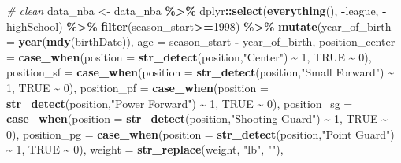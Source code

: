 \documentclass[
]{book}
\newenvironment{Shaded}{\begin{snugshade}}{\end{snugshade}}
\newcommand{\AttributeTok}[1]{\textcolor[rgb]{0.13,0.29,0.53}{#1}}
\newcommand{\CommentTok}[1]{\textcolor[rgb]{0.56,0.35,0.01}{\textit{#1}}}
\newcommand{\ConstantTok}[1]{\textcolor[rgb]{0.56,0.35,0.01}{#1}}
\newcommand{\DecValTok}[1]{\textcolor[rgb]{0.00,0.00,0.81}{#1}}
\newcommand{\FunctionTok}[1]{\textcolor[rgb]{0.13,0.29,0.53}{\textbf{#1}}}
\newcommand{\NormalTok}[1]{#1}
\newcommand{\OtherTok}[1]{\textcolor[rgb]{0.56,0.35,0.01}{#1}}
\newcommand{\SpecialCharTok}[1]{\textcolor[rgb]{0.81,0.36,0.00}{\textbf{#1}}}
\newcommand{\StringTok}[1]{\textcolor[rgb]{0.31,0.60,0.02}{#1}}
\begin{document}
\begin{Shaded}
\begin{Highlighting}[]
\CommentTok{\# clean}
\NormalTok{data\_nba }\OtherTok{\textless{}{-}}\NormalTok{ data\_nba }\SpecialCharTok{\%\textgreater{}\%}
\NormalTok{        dplyr}\SpecialCharTok{::}\FunctionTok{select}\NormalTok{(}\FunctionTok{everything}\NormalTok{(), }\SpecialCharTok{{-}}\NormalTok{league, }\SpecialCharTok{{-}}\NormalTok{highSchool) }\SpecialCharTok{\%\textgreater{}\%}
        \FunctionTok{filter}\NormalTok{(season\_start}\SpecialCharTok{\textgreater{}=}\DecValTok{1998}\NormalTok{) }\SpecialCharTok{\%\textgreater{}\%}
  \FunctionTok{mutate}\NormalTok{(}\AttributeTok{year\_of\_birth =} \FunctionTok{year}\NormalTok{(}\FunctionTok{mdy}\NormalTok{(birthDate)),}
         \AttributeTok{age =}\NormalTok{ season\_start }\SpecialCharTok{{-}}\NormalTok{ year\_of\_birth,}
         \AttributeTok{position\_center =} 
      \FunctionTok{case\_when}\NormalTok{(}\AttributeTok{position =} \FunctionTok{str\_detect}\NormalTok{(position,}\StringTok{"Center"}\NormalTok{) }\SpecialCharTok{\textasciitilde{}} \DecValTok{1}\NormalTok{,}
                \ConstantTok{TRUE} \SpecialCharTok{\textasciitilde{}} \DecValTok{0}\NormalTok{),}
    \AttributeTok{position\_sf =} 
      \FunctionTok{case\_when}\NormalTok{(}\AttributeTok{position =} \FunctionTok{str\_detect}\NormalTok{(position,}\StringTok{"Small Forward"}\NormalTok{) }\SpecialCharTok{\textasciitilde{}} \DecValTok{1}\NormalTok{,}
                \ConstantTok{TRUE} \SpecialCharTok{\textasciitilde{}} \DecValTok{0}\NormalTok{),}
    \AttributeTok{position\_pf =} 
      \FunctionTok{case\_when}\NormalTok{(}\AttributeTok{position =} \FunctionTok{str\_detect}\NormalTok{(position,}\StringTok{"Power Forward"}\NormalTok{) }\SpecialCharTok{\textasciitilde{}} \DecValTok{1}\NormalTok{,}
                \ConstantTok{TRUE} \SpecialCharTok{\textasciitilde{}} \DecValTok{0}\NormalTok{),}
    \AttributeTok{position\_sg =} 
      \FunctionTok{case\_when}\NormalTok{(}\AttributeTok{position =} \FunctionTok{str\_detect}\NormalTok{(position,}\StringTok{"Shooting Guard"}\NormalTok{) }\SpecialCharTok{\textasciitilde{}} \DecValTok{1}\NormalTok{,}
                \ConstantTok{TRUE} \SpecialCharTok{\textasciitilde{}} \DecValTok{0}\NormalTok{),}
    \AttributeTok{position\_pg =} 
      \FunctionTok{case\_when}\NormalTok{(}\AttributeTok{position =} \FunctionTok{str\_detect}\NormalTok{(position,}\StringTok{"Point Guard"}\NormalTok{) }\SpecialCharTok{\textasciitilde{}} \DecValTok{1}\NormalTok{,}
                \ConstantTok{TRUE} \SpecialCharTok{\textasciitilde{}} \DecValTok{0}\NormalTok{),}
    \AttributeTok{weight =} \FunctionTok{str\_replace}\NormalTok{(weight, }\StringTok{"lb"}\NormalTok{, }\StringTok{""}\NormalTok{),}

\end{Highlighting}
\end{Shaded}
\end{document}
